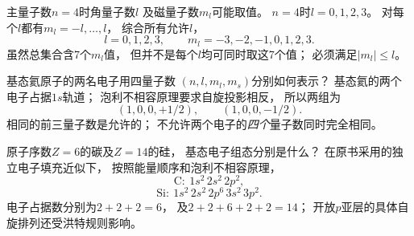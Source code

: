 \problemtext 主量子数$n=4$时角量子数$l$
及磁量子数$m_l$可能取值。
\workings
$n=4$时$l=0,1,2,3$。
对每个$l$都有$m_l=-l,\ldots,l$，
综合所有允许$l$，
\[
\boxed{l=0,1,2,3},\qquad
\boxed{m_l=-3,-2,-1,0,1,2,3}.
\]
\crosscheck 虽然总集合含7个$m_l$值，
但并不是每个$l$均可同时取这7个值；
必须满足$|m_l|\le l$。

\problemtext 基态氦原子的两名电子用四量子数
$(n,l,m_l,m_s)$分别如何表示？
\workings
基态氦的两个电子占据$1s$轨道；
泡利不相容原理要求自旋投影相反，
所以两组为
\[
\boxed{(1,0,0,+1/2)},\qquad
\boxed{(1,0,0,-1/2)}.
\]
\crosscheck 相同的前三量子数是允许的；
不允许两个电子的\emph{四个}量子数同时完全相同。

\problemtext 原子序数$Z=6$的碳及$Z=14$的硅，
基态电子组态分别是什么？
\workings
在原书采用的独立电子填充近似下，
按照能量顺序和泡利不相容原理，
\[
\boxed{\mathrm C:\ 1s^2\,2s^2\,2p^2},
\]
\[
\boxed{\mathrm{Si}:\ 1s^2\,2s^2\,2p^6\,3s^2\,3p^2}.
\]
\crosscheck 电子占据数分别为$2+2+2=6$，
及$2+2+6+2+2=14$；
开放$p$亚层的具体自旋排列还受洪特规则影响。
